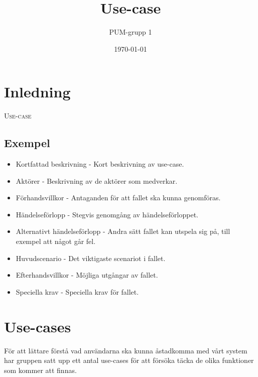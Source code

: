 

\ifpdf
\else
\fi

\title{Use-case}
\author{PUM-grupp 1}
\date{\today}



\maketitle\thispagestyle{empty}

\newpage

\section{Inledning}

\textsc{\LARGE Use-case}

\subsection{Exempel}
\begin{itemize}
	\item Kortfattad beskrivning - Kort beskrivning av use-case.
	\item Aktörer - Beskrivning av de aktörer som medverkar.
	\item Förhandsvillkor - Antaganden för att fallet ska kunna genomföras.
	\item Händelseförlopp - Stegvis genomgång av händelseförloppet.
	\item Alternativt händelseförlopp - Andra sätt fallet kan utspela sig på, till exempel att något går fel.
	\item Huvudscenario - Det viktigaste scenariot i fallet.
	\item Efterhandsvillkor - Möjliga utgångar av fallet.
	\item Speciella krav - Speciella krav för fallet.
\end{itemize}

\section{Use-cases} 

För att lättare förstå vad användarna ska kunna åstadkomma med vårt system har gruppen satt upp ett antal use-cases för att försöka täcka de olika funktioner som kommer att finnas.


